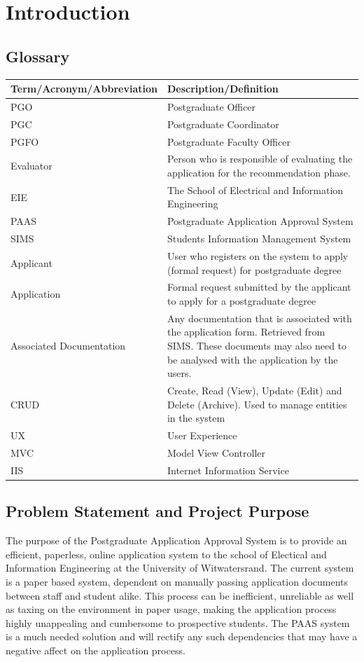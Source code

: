 \documentclass{article}
\begin{document}
\pagebreak

\section{Introduction}
\subsection{Glossary}
\begin{tabu} to \textwidth {| X[l] | X[l] |}
\hline
\textbf{Term/Acronym/Abbreviation} & \textbf{Description/Definition} \\
\hline
PGO & Postgraduate Officer \\
\hline
PGC & Postgraduate Coordinator \\
\hline
PGFO & Postgraduate Faculty Officer \\
\hline
Evaluator & Person who is responsible of evaluating the application for the recommendation phase. \\
\hline
EIE & The School of Electrical and Information Engineering \\
\hline
PAAS & Postgraduate Application Approval System \\
\hline
SIMS & Students Information Management System \\
\hline
Applicant & User who registers on the system to apply (formal request) for postgraduate degree \\
\hline
Application & Formal request submitted by the applicant to apply for a postgraduate degree \\
\hline
Associated Documentation & Any documentation that is associated with the application form. Retrieved from SIMS. These documents may also need to be analysed with the application by the users. \\
\hline
CRUD & Create, Read (View), Update (Edit) and Delete (Archive). Used to manage entities in the system \\
\hline
UX & User Experience \\
\hline
MVC & Model View Controller \\
\hline
IIS & Internet Information Service \\
\hline
\end{tabu}
\subsection{Problem Statement and Project Purpose}
The purpose of the Postgraduate Application Approval System is to provide an efficient, paperless, online application system to the school of Electical and Information Engineering at the University of Witwatersrand. The current system is a paper based system, dependent on manually passing application documents between staff and student alike. This process can be inefficient, unreliable as well as taxing on the environment in paper usage, making the application process highly unappealing and cumbersome to prospective students. The PAAS system is a much needed solution and will rectify any such dependencies that may have a negative affect on the application process.
\end{document}
